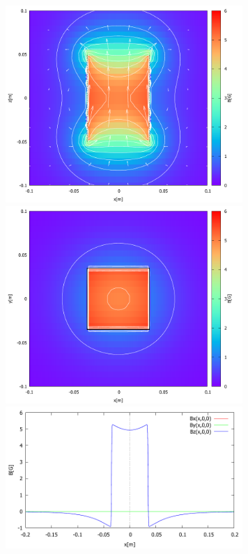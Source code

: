 \begin{figure}[H]
\begin{center}
\includegraphics[width=9cm]{analysis/B/coil11_image1.pdf}
\vspace{-1mm}
\vspace{-3mm}
\includegraphics[width=9cm]{analysis/B/coil11_image2.pdf}
\vspace{-1mm}
\vspace{-3mm}
\includegraphics[width=9cm]{analysis/B/coil11_danmen1.pdf}

\end{center}
\end{figure}
